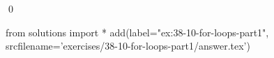 
\begin{ex}
  \label{ex:38-10-for-loops-part1}
  
  \qed
\end{ex}
\begin{python0}
from solutions import *
add(label="ex:38-10-for-loops-part1",
    srcfilename='exercises/38-10-for-loops-part1/answer.tex')
\end{python0}
